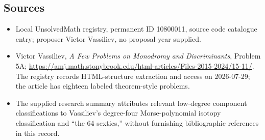 \documentclass[11pt]{article}
\begin{document}
\subsection{Sources}
\begin{itemize}
\item Local UnsolvedMath registry, permanent ID 10800011, source code catalogue entry; proposer Victor Vassiliev, no proposal year supplied.
\item Victor Vassiliev, \emph{A Few Problems on Monodromy and Discriminants}, Problem 5A; \url{https://amj.math.stonybrook.edu/html-articles/Files-2015-2024/15-11/}. The registry records HTML-structure extraction and access on 2026-07-29; the article has eighteen labeled theorem-style problems.
\item The supplied research summary attributes relevant low-degree component classifications to Vassiliev's degree-four Morse-polynomial isotopy classification and ``the 64 sextics,'' without furnishing bibliographic references in this record.
\end{itemize}
\end{document}
